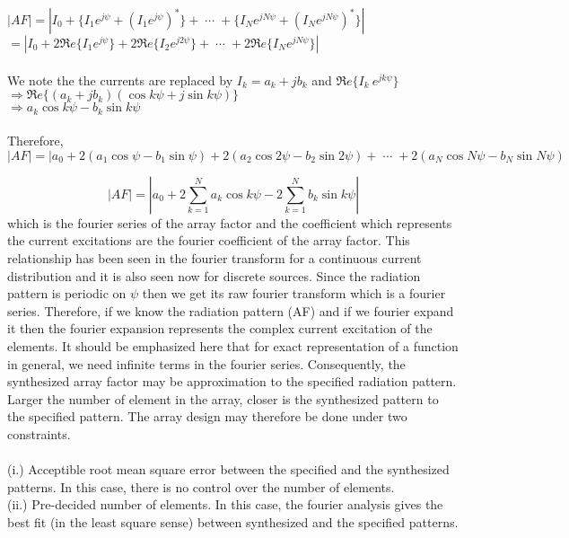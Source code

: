 	$|AF| = |I_0 + \{I_1 e^{j\psi} + (I_1 e^{j\psi})^\ast\} + \; \cdots \; + \{I_N e^{jN\psi} + (I_N e^{jN\psi})^\ast\}|$\\
	
	$= |I_0 + 2\Re e\{I_1 e^{j\psi}\} + 2\Re e\{I_2 e^{j2\psi}\} + \; \cdots \; + 2\Re e\{I_N e^{jN\psi}\}|$\\
	\\
	We note the the currents are replaced by $I_k = a_k + jb_k $ and $\Re e\{I_k\ e^{jk\psi}\}$\\
	
	$\Rightarrow \Re e\{(a_k + jb_k)(\cos k\psi + j\sin k\psi)\}$\\
	
	$\Rightarrow a_k\cos k\psi - b_k\sin k\psi$\\
	\\
	Therefore,
	\begin{dmath*}
		|AF| = |a_0 + 2(a_1\cos\psi - b_1\sin\psi) + 2(a_2\cos2\psi - b_2\sin 2\psi) + \; \cdots \; + 2(a_N\cos N\psi - b_N\sin N\psi)
	\end{dmath*}

	\begin{dmath}
		|AF| = \left|a_0 + 2\sum_{k=1}^{N} a_k\cos k\psi -2\sum_{k=1}^{N}b_k\sin k\psi\right|
		\label{eqn56}
	\end{dmath}
	which is the fourier series of the array factor and the coefficient which represents the current excitations are the fourier coefficient of the array factor. This relationship has been seen in the fourier transform for a continuous current distribution and it is also seen now for discrete sources. Since the radiation pattern is periodic on $\psi$ then we get its raw fourier transform which is a fourier series. Therefore, if we know the radiation pattern (AF) and if we fourier expand it then the fourier expansion represents the complex current excitation of the elements. It should be emphasized here that for exact representation of a function in general, we need infinite terms in the fourier series. Consequently, the synthesized array factor may be  approximation  to the specified radiation pattern. Larger the number of element in the array, closer is the synthesized pattern to the specified pattern. The array design may therefore be done under two constraints.\\
	\\
	(i.) \; Acceptible root mean square error between the specified and the synthesized patterns. In this case, there is no control over the number of elements.\\
	(ii.) \; Pre-decided number of elements. In this case, the fourier analysis gives the best fit (in the least square sense) between synthesized and the specified patterns.\\
	
